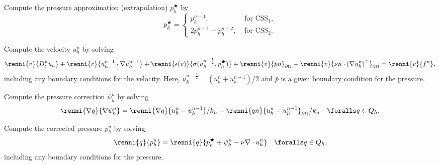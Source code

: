 {
\item
  Compute the pressure approximation (extrapolation)
  $p_h^{\bigstar}$ by
  \begin{equation}\label{eq:css,1a}
    p_h^{\bigstar} =
    \left\{
    \begin{array}{ll}
      p_h^{n-1}, & \mbox{ for } \mathrm{CSS}_1, \\
      2 p_h^{n-1} - p_h^{n-2}, & \mbox{ for } \mathrm{CSS}_2.
    \end{array}
    \right.
  \end{equation}

\item
  Compute the velocity $u_h^n$ by solving
  \begin{equation}\label{eq:css,2}
    \begin{split}
      \renni{v}{D_t^n u_h}
      + \renni{v}{u_h^{n-1} \cdot \nabla u_h^{n-1}}
      + \renni{\epsilon(v)}{\sigma(u^{n-\frac{1}{2}}_h, p_h^{\bigstar})}
      + \renni{v}{\bar{p} n}_{\partial\Omega}
      - \renni{v}{\nu n \cdot (\nabla \bar{u}_h^n)^{\top}}_{\partial\Omega}
      = \renni{v}{f^n},
    \end{split}
  \end{equation}
  including any boundary conditions for the velocity. Here,
  $u^{n-\frac{1}{2}}_h = (u_h^n + u_h^{n-1}) / 2$ and $\bar{p}$ is a given
  boundary condition for the pressure.

\item
  Compute the pressure correction $\psi_h^n$ by solving
  \begin{equation}\label{eq:css,3}
    \renni{\nabla q}{\nabla \psi_h^n}
    = \renni{\nabla q}{u_h^n - u_h^{n-1}} / k_n
    - \renni{qn}{u_h^n - u_h^{n-1}}_{\partial\Omega} / k_n
    \quad \foralls q \in Q_h.
  \end{equation}

\item
  Compute the corrected pressure $p_h^n$ by solving
  \begin{equation}\label{eq:css,4}
    \renni{q}{p_h^n} = \renni{q}{p_h^{\bigstar} + \psi_h^n - \nu \nabla \cdot u_h^n}
    \quad \foralls q \in Q_h,
  \end{equation}
  including any boundary conditions for the pressure.
}

\renewcommand{\scheme}[3]{%
\begin{figure}
  \center
    \small
    \begin{tabular}{l}
      \toprule
      \textbf{Scheme #1:} #2 \\
      \midrule
  \begin{minipage}{.93\textwidth}
        \vspace{0.1cm}
        \begin{enumerate}
          #3
        \end{enumerate}
        \vspace{0.1cm}
      \end{minipage} \\
      \bottomrule
    \end{tabular}
    \normalsize
\end{figure}}



